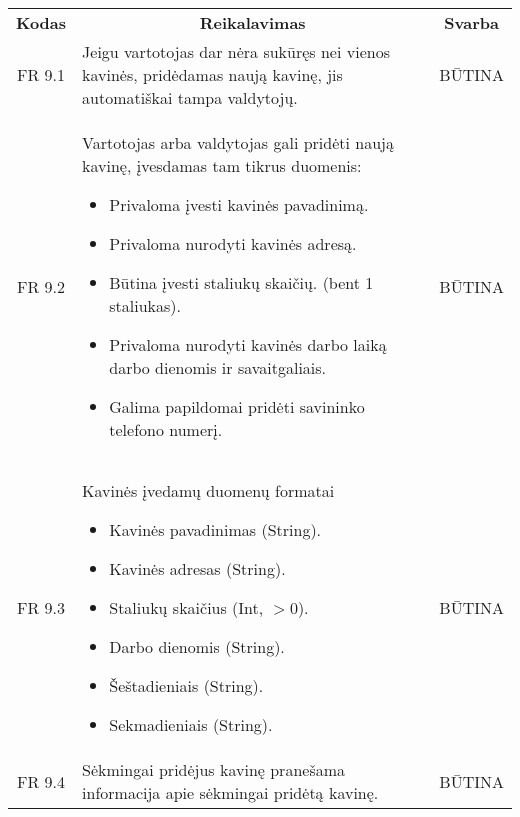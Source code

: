\documentclass{VUMIFPSkursinis}
\begin{document}
\begin{center}
	\begin{table}[H]
	\begin{tabular}{|p{2cm}|p{}|p{}|}
	
	\hline
	    \rowcolor{lightgray}
		\multicolumn{3}{|c|}{Kavinės pridėjimas}\\
		
	\hline
		\multicolumn{1}{|c|}{{\bfseries Kodas}}&
		\multicolumn{1}{|c|}{{\bfseries Reikalavimas}}&
		\multicolumn{1}{|c|}{{\bfseries Svarba}}\\

	\hline
		\multicolumn{1}{|c|}{FR 9.1}&
		{Jeigu vartotojas dar nėra sukūręs nei vienos kavinės, pridėdamas naują kavinę, jis automatiškai tampa valdytojų.}&
		\multicolumn{1}{|c|}{BŪTINA}\\	

	\hline
		\multicolumn{1}{|c|}{FR 9.2}&
		{Vartotojas arba valdytojas gali pridėti naują kavinę, įvesdamas tam tikrus duomenis:
			\begin{itemize}
				\item Privaloma įvesti kavinės pavadinimą.
				\item Privaloma nurodyti kavinės adresą.
				\item Būtina įvesti staliukų skaičių. (bent 1 staliukas).
				\item Privaloma nurodyti kavinės darbo laiką darbo dienomis ir savaitgaliais.
				\item Galima papildomai pridėti savininko telefono numerį.
			\end{itemize}}&
		\multicolumn{1}{|c|}{BŪTINA}\\	

	\hline
		\multicolumn{1}{|c|}{FR 9.3}&
		{Kavinės įvedamų duomenų formatai
			\begin{itemize}
				\item Kavinės pavadinimas (String).
				\item Kavinės adresas (String).
				\item Staliukų skaičius (Int, $>$0).
				\item Darbo dienomis (String).
				\item Šeštadieniais (String).
				\item Sekmadieniais (String).
			\end{itemize}}&
		\multicolumn{1}{|c|}{BŪTINA}\\	

	\hline
		\multicolumn{1}{|c|}{FR 9.4}&
		{Sėkmingai pridėjus kavinę pranešama informacija apie sėkmingai pridėtą kavinę.}&
		\multicolumn{1}{|c|}{BŪTINA}\\	


\end{tabular}
\end{table}
\end{center}
\end{document}
